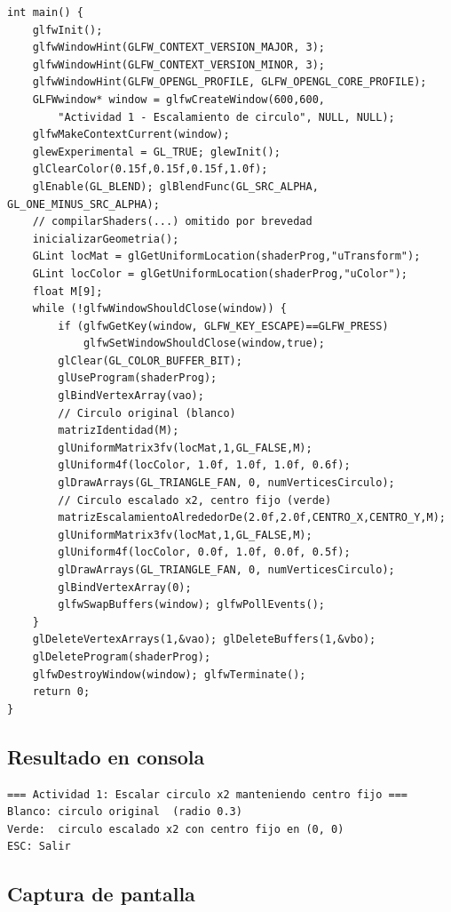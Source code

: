 \documentclass[12pt,a4paper]{article}
\begin{document}
\begin{lstlisting}[caption={actividadCirculo.cpp}]
int main() {
    glfwInit();
    glfwWindowHint(GLFW_CONTEXT_VERSION_MAJOR, 3);
    glfwWindowHint(GLFW_CONTEXT_VERSION_MINOR, 3);
    glfwWindowHint(GLFW_OPENGL_PROFILE, GLFW_OPENGL_CORE_PROFILE);
    GLFWwindow* window = glfwCreateWindow(600,600,
        "Actividad 1 - Escalamiento de circulo", NULL, NULL);
    glfwMakeContextCurrent(window);
    glewExperimental = GL_TRUE; glewInit();
    glClearColor(0.15f,0.15f,0.15f,1.0f);
    glEnable(GL_BLEND); glBlendFunc(GL_SRC_ALPHA, GL_ONE_MINUS_SRC_ALPHA);
    // compilarShaders(...) omitido por brevedad
    inicializarGeometria();
    GLint locMat = glGetUniformLocation(shaderProg,"uTransform");
    GLint locColor = glGetUniformLocation(shaderProg,"uColor");
    float M[9];
    while (!glfwWindowShouldClose(window)) {
        if (glfwGetKey(window, GLFW_KEY_ESCAPE)==GLFW_PRESS)
            glfwSetWindowShouldClose(window,true);
        glClear(GL_COLOR_BUFFER_BIT);
        glUseProgram(shaderProg);
        glBindVertexArray(vao);
        // Circulo original (blanco)
        matrizIdentidad(M);
        glUniformMatrix3fv(locMat,1,GL_FALSE,M);
        glUniform4f(locColor, 1.0f, 1.0f, 1.0f, 0.6f);
        glDrawArrays(GL_TRIANGLE_FAN, 0, numVerticesCirculo);
        // Circulo escalado x2, centro fijo (verde)
        matrizEscalamientoAlrededorDe(2.0f,2.0f,CENTRO_X,CENTRO_Y,M);
        glUniformMatrix3fv(locMat,1,GL_FALSE,M);
        glUniform4f(locColor, 0.0f, 1.0f, 0.0f, 0.5f);
        glDrawArrays(GL_TRIANGLE_FAN, 0, numVerticesCirculo);
        glBindVertexArray(0);
        glfwSwapBuffers(window); glfwPollEvents();
    }
    glDeleteVertexArrays(1,&vao); glDeleteBuffers(1,&vbo);
    glDeleteProgram(shaderProg);
    glfwDestroyWindow(window); glfwTerminate();
    return 0;
}
\end{lstlisting}

\subsection{Resultado en consola}

\begin{verbatim}
=== Actividad 1: Escalar circulo x2 manteniendo centro fijo ===
Blanco: circulo original  (radio 0.3)
Verde:  circulo escalado x2 con centro fijo en (0, 0)
ESC: Salir
\end{verbatim}

\subsection{Captura de pantalla}
\end{document}
